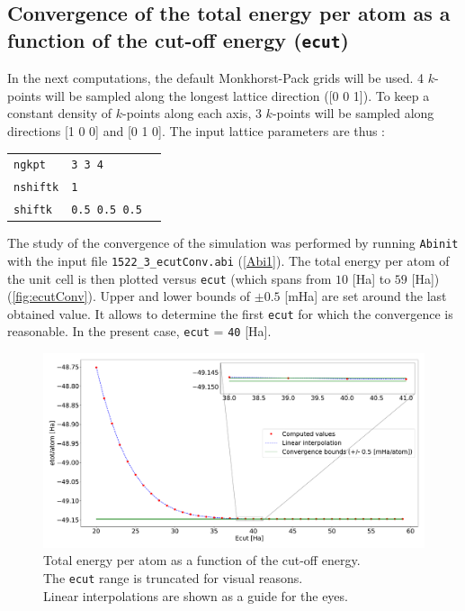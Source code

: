 \documentclass[11pt,a4paper]{article}
\begin{document}
\subsection{Convergence of the total energy per atom as a function of the cut-off energy (\texttt{ecut})}
In the next computations, the default Monkhorst-Pack grids will be used. 4 $k$-points will be sampled along the longest lattice direction ([0 0 1]). To keep a constant density of $k$-points along each axis, 3 $k$-points will be sampled along directions [1 0 0] and  [0 1 0]. The input lattice parameters are thus :
\begin{center}
\begin{tabular}{lll}
\texttt{ngkpt} & \texttt{3 3 4}&\\
\texttt{nshiftk} & \texttt{1} &\\
\texttt{shiftk} &\texttt{0.5 0.5 0.5}
\end{tabular}
\end{center}
The study of the convergence of the simulation was performed by running \texttt{Abinit} with the input file \texttt{1522\_3\_ecutConv.abi} (\autoref{Abi1}).
The total energy per atom of the unit cell is then plotted versus \texttt{ecut} (which spans from $10$ [Ha] to $59$ [Ha]) (\autoref{fig:ecutConv}). Upper and lower bounds of $\pm 0.5$ [mHa] are set around the last obtained value. It allows to determine the first \texttt{ecut} for which the convergence is reasonable. In the present case, \texttt{ecut} = \texttt{40} [Ha].
\begin{figure}[H]
\includegraphics[width=\textwidth]{images/etotecut}
\caption{Total energy per atom as a function of the cut-off energy.\\
The \texttt{ecut} range is truncated for visual reasons.\\
Linear interpolations are shown as a guide for the eyes.}
\label{fig:ecutConv}
\end{figure}
\end{document}
